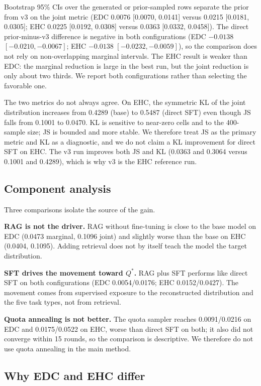 Bootstrap 95\% CIs over the generated or prior-sampled rows separate the
prior from v3 on the joint metric (EDC 0.0076 {[}0.0070, 0.0141{]}
versus 0.0215 {[}0.0181, 0.0305{]}; EHC 0.0225 {[}0.0192, 0.0308{]}
versus 0.0363 {[}0.0332, 0.0458{]}). The direct prior-minus-v3
difference is negative in both configurations (EDC \(-0.0138\)
\([-0.0210, -0.0067]\); EHC \(-0.0138\) \([-0.0232, -0.0059]\)), so the
comparison does not rely on non-overlapping marginal intervals. The EHC
result is weaker than EDC: the marginal reduction is large in the best
run, but the joint reduction is only about two thirds. We report both
configurations rather than selecting the favorable one.

The two metrics do not always agree. On EHC, the symmetric KL of the
joint distribution increases from 0.4289 (base) to 0.5487 (direct SFT)
even though JS falls from 0.1001 to 0.0470. KL is sensitive to near-zero
cells and to the 400-sample size; JS is bounded and more stable. We
therefore treat JS as the primary metric and KL as a diagnostic, and we
do not claim a KL improvement for direct SFT on EHC. The v3 run improves
both JS and KL (0.0363 and 0.3064 versus 0.1001 and 0.4289), which is
why v3 is the EHC reference run.

\subsection{Component analysis}\label{component-analysis}

Three comparisons isolate the source of the gain.

\textbf{RAG is not the driver.} RAG without fine-tuning is close to the
base model on EDC (0.0473 marginal, 0.1096 joint) and slightly worse
than the base on EHC (0.0404, 0.1095). Adding retrieval does not by
itself teach the model the target distribution.

\textbf{SFT drives the movement toward \(Q^{\ast}\).} RAG plus SFT
performs like direct SFT on both configurations (EDC 0.0054/0.0176; EHC
0.0152/0.0427). The movement comes from supervised exposure to the
reconstructed distribution and the five task types, not from retrieval.

\textbf{Quota annealing is not better.} The quota sampler reaches
0.0091/0.0216 on EDC and 0.0175/0.0522 on EHC, worse than direct SFT on
both; it also did not converge within 15 rounds, so the comparison is
descriptive. We therefore do not use quota annealing in the main method.

\subsection{Why EDC and EHC differ}\label{why-edc-and-ehc-differ}


